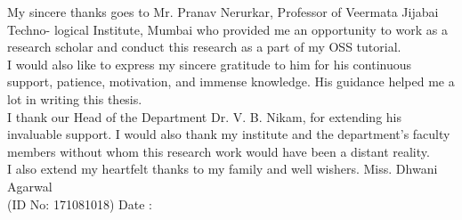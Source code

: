\cleardoublepage


\begin{acknowledgements}

My sincere thanks goes to Mr.  Pranav Nerurkar, Professor of Veermata Jijabai Techno-
logical Institute, Mumbai who provided me an opportunity to work as a research scholar
and conduct this research as a part of my OSS tutorial.\\
I  would  also  like  to  express  my  sincere  gratitude  to  him  for  his  continuous  support,
patience, motivation, and immense knowledge.  His guidance helped me a lot in writing
this thesis.\\
I  thank  our  Head  of  the  Department  Dr.   V.  B.  Nikam,  for  extending  his  invaluable
support.  I would also thank my institute and the department’s faculty members without
whom this research work would have been a distant reality.\\
I also extend my heartfelt thanks to my family and well wishers.
\vfill
    Miss. Dhwani Agarwal \\ (ID No: 171081018) \hfill Date :\underline{\hspace{1.5in}}

\end{acknowledgements}